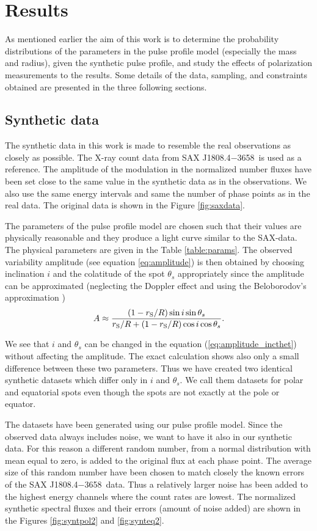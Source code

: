 \documentclass{wihuri}
\def\rg{r_{\rm S}} %
\def\be{\begin{equation}}
\def\ee{\end{equation}}
\def\rg{r_{\rm S}} %
\def\source{SAX J1808.4$-$3658}
\def\thetas{\theta_{s}}
\begin{document}
\clearpage

\section{Results}

As mentioned earlier the aim of this work is to determine the probability distributions of the parameters in the pulse profile model (especially the mass and radius), given the synthetic pulse profile, and study the effects of polarization measurements to the results. Some details of the data, sampling, and constraints obtained are presented in the three following sections. 


\subsection{Synthetic data}

The synthetic data in this work is made to resemble the real observations as closely as possible. The X-ray count data from \source \ is used as a reference. The amplitude of the modulation in the normalized number fluxes have been set close to the same value in the synthetic data as in the observations. We also use the same energy intervals and same the number of phase points as in the real data. The original data is shown in the Figure \ref{fig:saxdata}.  


The parameters of the pulse profile model are chosen such that their values are physically reasonable and they produce a light curve similar to the SAX-data. The physical parameters are given in the Table \ref{table:params}. The observed variability amplitude (see equation \ref{eq:amplitude}) is then obtained by choosing inclination $i$ and the colatitude of the spot $\thetas$ appropriately since the amplitude can be approximated (neglecting the Doppler effect and using the Beloborodov's approximation \cite{poutaviironen})
\be \label{eq:amplitude_incthet}
A \approx \frac{(1-\rg/R)\sin i \sin \thetas}{\rg/R+(1-\rg/R)\cos i \cos \thetas}.
\ee 

We see that $i$ and $\thetas$ can be changed in the equation (\ref{eq:amplitude_incthet}) without affecting the amplitude. The exact calculation shows also only a small difference between these two parameters. Thus we have created two identical synthetic datasets which differ only in $i$ and $\thetas$. We call them datasets for polar and equatorial spots even though the spots are not exactly at the pole or equator. 

The datasets have been generated using our pulse profile model. Since the observed data always includes noise, we want to have it also in our synthetic data. For this reason a different random number, from a normal distribution with mean equal to zero, is added to the original flux at each phase point. The average size of this random number have been chosen to match closely the known errors of the \source \ data. Thus a relatively larger noise has been added to the highest energy channels where the count rates are lowest. The normalized synthetic spectral fluxes and their errors (amount of noise added) are shown in the Figures \ref{fig:syntpol2} and \ref{fig:synteq2}.
\end{document}
